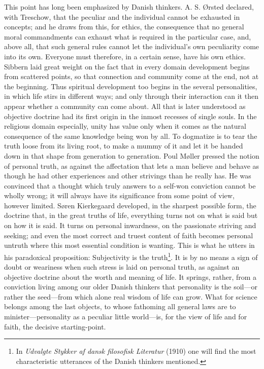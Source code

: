 \documentclass[12pt,a4paper]{article}
\newcommand{\opage}[1]{\marginnote{\footnotesize\textit{[#1]}}}
\begin{document}
This point has long been emphasized by Danish thinkers. A. S. Ørsted declared, with
Treschow, that the peculiar and the individual cannot be exhausted in concepts; and he
draws from this, for ethics, the consequence that no general moral commandments can
exhaust what is required in the particular case, and, above all, that such general
rules cannot let the individual's own peculiarity come into its own. Everyone must
therefore, in a certain sense, have his own ethics. Sibbern laid great weight on the
fact that in every domain development begins from scattered points, so that connection
and community come at the end, not at the beginning. Thus spiritual development too
begins in the several personalities, in which life stirs in different ways; and only
through their interaction can it then appear whether a community can come about. All
that is later understood as objective doctrine had its first origin in the inmost
recesses of single souls. In the religious domain especially, unity has value only
when it comes as the natural consequence of the same knowledge being won by all. To
dogmatize is to tear \opage{49}the truth loose from its living root, to make a mummy of it and
let it be handed down in that shape from generation to generation. Poul Møller pressed
the notion of personal truth, as against the affectation that lets a man believe and
behave as though he had other experiences and other strivings than he really has. He
was convinced that a thought which truly answers to a self-won conviction cannot be
wholly wrong; it will always have its significance from some point of view, however
limited. Søren Kierkegaard developed, in the sharpest possible form, the doctrine that,
in the great truths of life, everything turns not on what is said but on how it is
said. It turns on personal inwardness, on the passionate striving and seeking; and
even the most correct and truest content of faith becomes personal untruth where this
most essential condition is wanting. This is what he utters in his paradoxical
proposition: Subjectivity is the truth\footnote{In
\emph{Udvalgte Stykker af dansk filosofisk Literatur} (1910) one will find the most
characteristic utterances of the Danish thinkers mentioned.}. It is by no means a
sign of doubt or weariness when such stress is laid on personal truth, as against an
objective doctrine about the worth and meaning of life. It springs, rather, from a
conviction living among our older Danish thinkers that personality is the soil---or
rather the seed---from which alone real wisdom of life can grow. What for science
belongs among the last objects, to whose fathoming all general laws are to
minister---personality as a peculiar little world---is, for the view of life and for
faith, the decisive starting-point.
\end{document}
